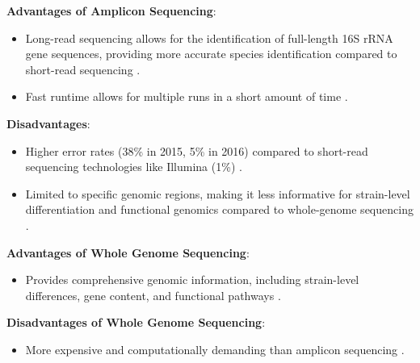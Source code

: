 \textbf{Advantages of Amplicon Sequencing}:

\begin{itemize}
    \item Long-read sequencing allows for the identification of full-length 16S rRNA gene sequences, providing more accurate species identification compared to short-read sequencing \cite*{LS10}.
    \item Fast runtime allows for multiple runs in a short amount of time \cite*{LS10}.
\end{itemize}

\textbf{Disadvantages}:
\begin{itemize}
    \item Higher error rates (38\% in 2015, 5\% in 2016) compared to short-read sequencing technologies like Illumina (1\%) \cite*{LS10}.
    \item Limited to specific genomic regions, making it less informative for strain-level differentiation and functional genomics compared to whole-genome sequencing \cite*{L5-DNAEnrichment}.
\end{itemize}

\textbf{Advantages of Whole Genome Sequencing}:
\begin{itemize}
    \item Provides comprehensive genomic information, including strain-level differences, gene content, and functional pathways \cite*{L5-DNAEnrichment}.
\end{itemize}

\textbf{Disadvantages of Whole Genome Sequencing}:
\begin{itemize}
    \item More expensive and computationally demanding than amplicon sequencing \cite*{L5-DNAEnrichment,L3-SeqBasedClass}.
\end{itemize}





